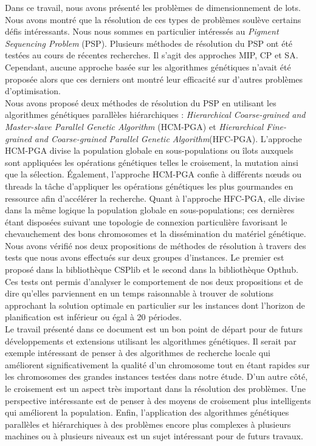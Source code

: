 
Dans ce travail, nous avons présenté	les problèmes de dimensionnement de lots. Nous avons montré que la résolution de ces types de problèmes soulève certains défis intéressants. Nous nous sommes en particulier intéressés au \emph{Pigment Sequencing Problem} (PSP). Plusieurs méthodes de résolution du PSP ont été testées au cours de récentes recherches. Il s'agit des approches MIP, CP et SA. Cependant, aucune approche basée sur les algorithmes génétiques n'avait été proposée alors que ces derniers ont montré leur efficacité sur d'autres problèmes d'optimisation.\\
	\hspace*{.5cm} Nous avons proposé deux méthodes de résolution du PSP en utilisant les algorithmes génétiques parallèles hiérarchiques : \emph{Hierarchical Coarse-grained and Master-slave Parallel Genetic Algorithm} (HCM-PGA) et \emph{Hierarchical Fine-grained and Coarse-grained Parallel Genetic Algorithm}(HFC-PGA). L'approche HCM-PGA divise la population globale en sous-populations ou îlots auxquels sont appliquées les opérations génétiques telles le croisement, la mutation ainsi que la sélection. Également, l'approche HCM-PGA confie à différents nœuds ou threads la tâche d'appliquer les opérations génétiques les plus gourmandes en ressource afin d'accélérer la recherche. Quant à l'approche HFC-PGA, elle divise dans la même logique la population globale en sous-populations; ces dernières étant disposées suivant une topologie de connexion particulière favorisant le chevauchement des bons chromosomes et la dissémination du matériel génétique. Nous avons vérifié nos deux propositions de méthodes de résolution à travers des tests que nous avons effectués sur deux groupes d'instances. Le premier est proposé dans la bibliothèque CSPlib et le second dans la bibliothèque Opthub. Ces tests ont permis d'analyser le comportement de nos deux propositions et de dire qu'elles parviennent en un temps raisonnable à trouver de solutions approchant la solution optimale en particulier sur les instances dont l'horizon de planification est inférieur ou égal à 20 périodes.\\
	\hspace*{.5cm}Le travail présenté dans ce document est un bon point de départ pour de futurs développements et extensions utilisant les algorithmes génétiques. Il serait par exemple intéressant de penser à des algorithmes de recherche locale qui améliorent significativement la qualité d'un chromosome tout en étant rapides sur les chromosomes des grandes instances testées dans notre étude. D'un autre côté, le croisement est un aspect très important dans la résolution des problèmes. Une perspective intéressante est de penser à des moyens de croisement plus intelligents qui améliorent la population. Enfin, l'application des algorithmes génétiques parallèles et hiérarchiques à des problèmes encore plus complexes à plusieurs machines ou à plusieurs niveaux est un sujet intéressant pour de futurs travaux. 